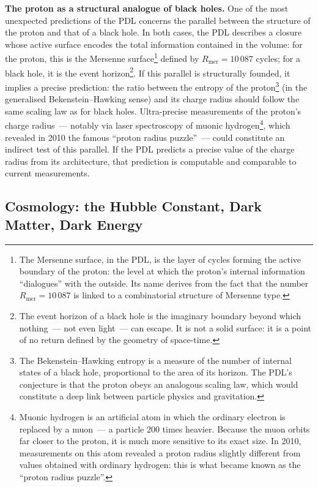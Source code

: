 \documentclass[12pt, a4paper, openright]{book}
\begin{document}
\textbf{The proton as a structural analogue of black holes.} One of the most unexpected predictions of the PDL concerns the parallel between the structure of the proton and that of a black hole. In both cases, the PDL describes a closure whose active surface encodes the total information contained in the volume: for the proton, this is the Mersenne surface\footnote{The Mersenne surface, in the PDL, is the layer of cycles forming the active boundary of the proton: the level at which the proton's internal information ``dialogues'' with the outside. Its name derives from the fact that the number $R_\text{mer} = 10\,087$ is linked to a combinatorial structure of Mersenne type.} defined by $R_\text{mer} = 10\,087$ cycles; for a black hole, it is the event horizon\footnote{The event horizon of a black hole is the imaginary boundary beyond which nothing~--- not even light~--- can escape. It is not a solid surface: it is a point of no return defined by the geometry of space-time.}. If this parallel is structurally founded, it implies a precise prediction: the ratio between the entropy of the proton\footnote{The Bekenstein--Hawking entropy is a measure of the number of internal states of a black hole, proportional to the area of its horizon. The PDL's conjecture is that the proton obeys an analogous scaling law, which would constitute a deep link between particle physics and gravitation.} (in the generalised Bekenstein--Hawking sense) and its charge radius should follow the same scaling law as for black holes. Ultra-precise measurements of the proton's charge radius~--- notably via laser spectroscopy of muonic hydrogen\footnote{Muonic hydrogen is an artificial atom in which the ordinary electron is replaced by a muon~--- a particle 200 times heavier. Because the muon orbits far closer to the proton, it is much more sensitive to its exact size. In 2010, measurements on this atom revealed a proton radius slightly different from values obtained with ordinary hydrogen: this is what became known as the ``proton radius puzzle''.}, which revealed in 2010 the famous ``proton radius puzzle''~--- could constitute an indirect test of this parallel. If the PDL predicts a precise value of the charge radius from its architecture, that prediction is computable and comparable to current measurements.

\subsection*{Cosmology: the Hubble Constant, Dark Matter, Dark Energy}
\end{document}
